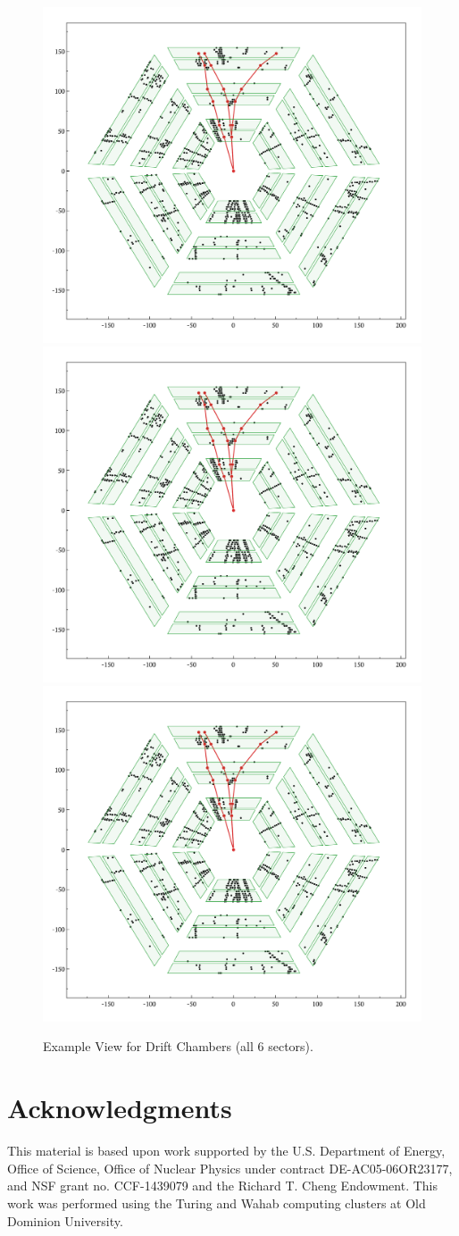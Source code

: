\documentclass[preprint,12pt]{elsarticle}
\begin{document}
\begin{figure}[h!]
\centering
\includegraphics[width=0.32\columnwidth]{images/dc_example_view.pdf}
\includegraphics[width=0.32\columnwidth]{images/dc_example_view.pdf}
\includegraphics[width=0.32\columnwidth]{images/dc_example_view.pdf}
\caption{Example View for Drift Chambers (all 6 sectors). } 
\label{fig:CLAS12}
\end{figure}


\section{Acknowledgments}

This material is based upon work supported by the U.S. Department of Energy, Office of Science, Office of Nuclear Physics under contract DE-AC05-06OR23177, and
 NSF grant no. CCF-1439079 and the Richard T. Cheng Endowment. This work was performed using the Turing and  Wahab computing clusters at Old Dominion University.
 
\end{document}
